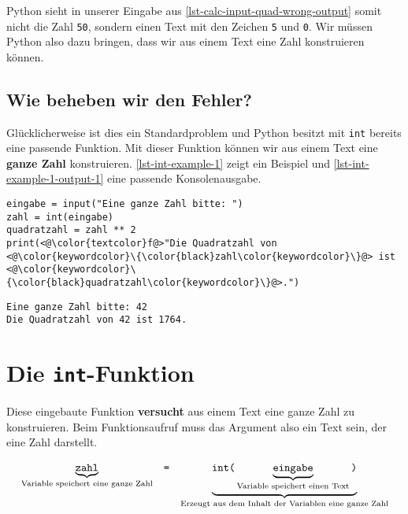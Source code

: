 Python sieht in unserer Eingabe aus \autoref{lst-calc-input-quad-wrong-output} somit nicht die Zahl \lstinline{50}, sondern einen Text mit den Zeichen \texttt{5} und \texttt{0}. Wir müssen Python also dazu bringen, dass wir aus einem Text eine Zahl konstruieren können.

\subsection{Wie beheben wir den Fehler?}

Glücklicherweise ist dies ein Standardproblem und Python besitzt mit \lstinline{int} bereits eine passende Funktion. Mit dieser Funktion können wir aus einem Text eine \textbf{ganze Zahl} konstruieren. \autoref{lst-int-example-1} zeigt ein Beispiel und \autoref{lst-int-example-1-output-1} eine passende Konsolenausgabe.

\begin{lstlisting}[language=python3, caption={In Zeile \num{2} wird eine ganze Zahl konstruiert.}, label={lst-int-example-1}]
eingabe = input("Eine ganze Zahl bitte: ")
zahl = int(eingabe)
quadratzahl = zahl ** 2
print(<@\color{textcolor}f@>"Die Quadratzahl von <@\color{keywordcolor}\{\color{black}zahl\color{keywordcolor}\}@> ist <@\color{keywordcolor}\{\color{black}quadratzahl\color{keywordcolor}\}@>.")
\end{lstlisting}

\begin{lstlisting}[language=output, caption={Beispielausführung für das Programm aus \autoref{lst-int-example-1} mit gültiger Eingabe.}, label={lst-int-example-1-output-1}]
Eine ganze Zahl bitte: 42
Die Quadratzahl von 42 ist 1764.
\end{lstlisting}

\section{Die \lstinline{int}-Funktion}

Diese eingebaute Funktion \textbf{versucht} aus einem Text eine ganze Zahl zu konstruieren. Beim Funktionsaufruf muss das Argument also ein Text sein, der eine Zahl darstellt.

$$
\begin{array}[t]{ccc} 
\underbrace{\textrm{\texttt{zahl}}}_{\textrm{Variable speichert eine ganze Zahl}} & \textrm{\texttt{=}} & \underbrace{\texttt{int(}\underbrace{\textrm{\texttt{eingabe}}}_{\textrm{Variable speichert einen Text}}\texttt{)}}_{\textrm{Erzeugt aus dem Inhalt der Variablen eine ganze Zahl}}
\end{array}
$$

